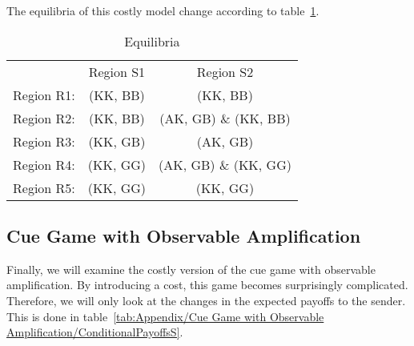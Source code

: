 \documentclass[a4paper,12pt]{article}
\numberwithin{equation}{section}
\begin{document}
The equilibria of this costly model change according to table~\ref{tab:Appendix/Cue Game with Unobservable Amplification/Equilibria}.
\begin{table}[!h]
\begin{center}
\begin{tabular}{lcc}
 & Region S1 & Region S2\\
Region R1: & (KK, BB) & (KK, BB)\\
Region R2: & (KK, BB) & (AK, GB) \& (KK, BB)\\
Region R3: & (KK, GB) & (AK, GB)\\
Region R4: & (KK, GG) & (AK, GB) \& (KK, GG)\\
Region R5: & (KK, GG) & (KK, GG)
\end{tabular}
\end{center}
\caption{Equilibria}
\label{tab:Appendix/Cue Game with Unobservable Amplification/Equilibria}
\end{table}

\newpage \clearpage


\subsection{Cue Game with Observable Amplification}
\label{sec:Appendix/Cue Game with Observable Amplification}

Finally, we will examine the costly version of the cue game with observable amplification. By introducing a cost, this game becomes surprisingly complicated. Therefore, we will only look at the changes in the expected payoffs to the sender. This is done in table~\ref{tab:Appendix/Cue Game with Observable Amplification/ConditionalPayoffsS}.
\end{document}
